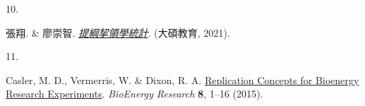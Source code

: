 \documentclass[
]{book}
\newlength{\cslhangindent}
\newlength{\csllabelwidth}
\newlength{\cslentryspacingunit} %
\newenvironment{CSLReferences}[2] %
 {%
  \setlength{\parindent}{0pt}
  \ifodd #1
  \let\oldpar\par
  \def\par{\hangindent=\cslhangindent\oldpar}
  \fi
  \setlength{\parskip}{#2\cslentryspacingunit}
 }%
 {}
\newcommand{\CSLLeftMargin}[1]{\parbox[t]{\csllabelwidth}{#1}}
\newcommand{\CSLRightInline}[1]{\parbox[t]{\linewidth - \csllabelwidth}{#1}\break}
\theoremstyle{definition}
\theoremstyle{definition}
\theoremstyle{definition}
\theoremstyle{definition}
\theoremstyle{remark}
\begin{document}
\begin{CSLReferences}{0}{0}
\leavevmode{}%
\CSLLeftMargin{10. }%
\CSLRightInline{張翔. \& 廖崇智. \emph{\href{https://www.books.com.tw/products/0010888833}{提綱挈領學統計}}. (大碩教育, 2021).}

\leavevmode{}%
\CSLLeftMargin{11. }%
\CSLRightInline{Casler, M. D., Vermerris, W. \& Dixon, R. A. \href{https://doi.org/10.1007/s12155-015-9580-7}{Replication Concepts for Bioenergy Research Experiments}. \emph{BioEnergy Research} \textbf{8}, 1--16 (2015).}

\end{CSLReferences}
\end{document}
